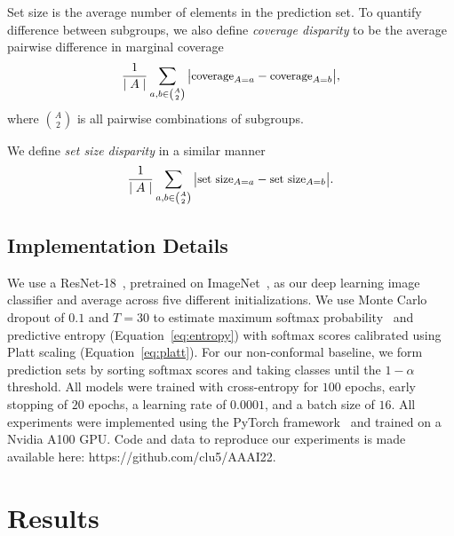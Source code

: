 \documentclass[letterpaper]{article} %
\begin{document}
        Set size is the average number of elements in the prediction set.
        To quantify difference between subgroups, we also define \textit{coverage disparity} to be the average pairwise difference in marginal coverage
        \begin{equation} \label{eq:cov-disparity}
        \small
        \frac{1}{\mid A \mid} \sum_{a, b \in \binom{A}{2}} \big\lvert \text{coverage}_{A=a} - \text{coverage}_{A=b} \big\rvert,
        \end{equation}
        where $\binom{A}{2}$ is all pairwise combinations of subgroups.
        
        We define \textit{set size disparity} in a similar manner 
        \begin{equation} \label{eq:card-disparity}
        \small
        \frac{1}{\mid A \mid} \sum_{a, b \in \binom{A}{2}} \big\lvert \text{set size}_{A=a} - \text{set size}_{A=b} \big\rvert.
        \end{equation}
        
    \subsection{Implementation Details}
        We use a ResNet-18~\cite{DBLP:journals/corr/XieGDTH16}, pretrained on ImageNet~\cite{imagenet_cvpr09}, as our deep learning image classifier and average across five different initializations.
        We use Monte Carlo dropout of $0.1$ and $T=30$ to estimate maximum softmax probability~\cite{hendrycks17baseline} and predictive entropy (Equation~\ref{eq:entropy}) with softmax scores calibrated using Platt scaling (Equation~\ref{eq:platt}).
        For our non-conformal baseline, we form prediction sets by sorting softmax scores and taking classes until the $1 - \alpha$ threshold.
        All models were trained with cross-entropy for $100$ epochs, early stopping of $20$ epochs, a learning rate of $0.0001$, and a batch size of $16$. 
        All experiments were implemented using the PyTorch framework~\cite{NEURIPS2019_9015} and trained on a Nvidia A100 GPU.
        Code and data to reproduce our experiments is made available here: https://github.com/clu5/AAAI22.
    
    
\section{Results}
\end{document}
